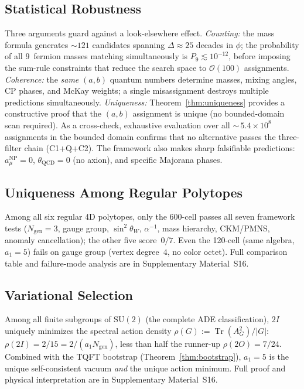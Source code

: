 \documentclass[12pt,a4paper]{article}
\theoremstyle{definition}
\begin{document}
\subsection{Statistical Robustness}
\label{sec:statistics}

Three arguments guard against a look-elsewhere effect.  \emph{Counting:}  the mass formula generates $\sim\!121$ candidates spanning $\Delta \approx 25$ decades in $\phi$; the probability of all 9~fermion masses matching simultaneously is $P_9 \lesssim 10^{-12}$, before imposing the sum-rule constraints that reduce the search space to $\mathcal{O}(100)$ assignments.  \emph{Coherence:}  the \emph{same} $(a,b)$ quantum numbers determine masses, mixing angles, CP phases, and McKay weights; a single misassignment destroys multiple predictions simultaneously.  \emph{Uniqueness:}  Theorem~\ref{thm:uniqueness} provides a constructive proof that the $(a,b)$ assignment is unique (no bounded-domain scan required).  As a cross-check, exhaustive evaluation over all ${\sim}\,5.4 \times 10^8$ assignments in the bounded domain confirms that no alternative passes the three-filter chain (C1+Q+C2).  The framework also makes sharp falsifiable predictions: $a_\mu^{\text{NP}} = 0$, $\theta_{\text{QCD}} = 0$ (no axion), and specific Majorana phases.

\subsection{Uniqueness Among Regular Polytopes}
\label{sec:uniqueness_polytopes}

Among all six regular 4D polytopes, only the 600-cell passes all seven framework tests ($N_{\text{gen}} = 3$, gauge group, $\sin^2\theta_W$, $\alpha^{-1}$, mass hierarchy, CKM/PMNS, anomaly cancellation); the other five score~$0/7$.  Even the 120-cell (same algebra, $a_1 = 5$) fails on gauge group (vertex degree~$4$, no color octet).  Full comparison table and failure-mode analysis are in Supplementary Material~S16.

\subsection{Variational Selection}
\label{sec:ade_variational}

Among all finite subgroups of $\mathrm{SU}(2)$ (the complete ADE classification), $2I$ uniquely minimizes the spectral action density $\rho(G) := \operatorname{Tr}(A_G^2)/|G|$: $\rho(2I) = 2/15 = 2/(a_1 N_{\text{gen}})$, less than half the runner-up $\rho(2O) = 7/24$.  Combined with the TQFT bootstrap (Theorem~\ref{thm:bootstrap}), $a_1 = 5$ is the unique self-consistent vacuum \emph{and} the unique action minimum.  Full proof and physical interpretation are in Supplementary Material~S16.
\end{document}
